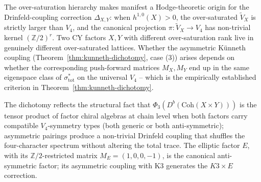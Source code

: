 \begin{remark}
\label{rem:hodge-source-of-bigrading-anomaly}
The over-saturation hierarchy makes manifest a Hodge-theoretic origin
for the Drinfeld-coupling correction $\Delta_{X, Y}$: when
$h^{1, 0}(X) > 0$, the over-saturated $\widetilde{V}_X$ is strictly
larger than $V_4$, and the canonical projection
$\pi : \widetilde{V}_X \to V_4$ has non-trivial kernel
$(\mathbb{Z}/2)^{r}$. Two CY factors $X, Y$ with different
over-saturation rank live in genuinely different over-saturated
lattices. Whether the asymmetric Künneth coupling
\textup{(}Theorem~\ref{thm:kunneth-dichotomy}, case (3)\textup{)}
arises depends on whether the corresponding push-forward matrices
$M_X, M_Y$ end up in the same eigenspace class of
$\sigma_{\mathrm{tot}}^*$ on the universal $V_4$ -- which is the
empirically established criterion in
Theorem~\ref{thm:kunneth-dichotomy}.
\end{remark}

\begin{remark}
\label{rem:kunneth-dichotomy-geometric}
The dichotomy reflects the structural fact that
$\Phi_3(D^b(\mathrm{Coh}(X \times Y)))$ is the tensor product of factor
chiral algebras at chain level when both factors carry compatible
$V_4$-symmetry types \textup{(}both generic or both anti-symmetric\textup{);}
asymmetric pairings produce a non-trivial Drinfeld coupling that
shuffles the four-character spectrum without altering the total trace.
The elliptic factor $E$, with its $\mathbb{Z}/2$-restricted matrix
$M_E = (1, 0, 0, -1)$, is the canonical anti-symmetric factor; its
asymmetric coupling with K$3$ generates the $K3 \times E$ correction.
\end{remark}

